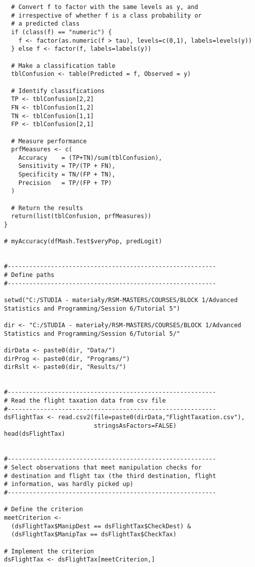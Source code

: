 \documentclass{article}
\begin{document}
\begin{tiny}
\begin{verbatim}
  # Convert f to factor with the same levels as y, and 
  # irrespective of whether f is a class probability or
  # a predicted class
  if (class(f) == "numeric") {
    f <- factor(as.numeric(f > tau), levels=c(0,1), labels=levels(y))
  } else f <- factor(f, labels=labels(y))
  
  # Make a classification table
  tblConfusion <- table(Predicted = f, Observed = y)
  
  # Identify classifications
  TP <- tblConfusion[2,2]
  FN <- tblConfusion[1,2]
  TN <- tblConfusion[1,1]
  FP <- tblConfusion[2,1]
  
  # Measure performance   
  prfMeasures <- c(
    Accuracy    = (TP+TN)/sum(tblConfusion),
    Sensitivity = TP/(TP + FN),
    Specificity = TN/(FP + TN),
    Precision   = TP/(FP + TP)
  )
  
  # Return the results
  return(list(tblConfusion, prfMeasures))
}

# myAccuracy(dfMash.Test$veryPop, predLogit)


#----------------------------------------------------------
# Define paths
#----------------------------------------------------------

setwd("C:/STUDIA - materiały/RSM-MASTERS/COURSES/BLOCK 1/Advanced Statistics and Programming/Session 6/Tutorial 5")

dir <- "C:/STUDIA - materiały/RSM-MASTERS/COURSES/BLOCK 1/Advanced Statistics and Programming/Session 6/Tutorial 5/"

dirData <- paste0(dir, "Data/")
dirProg <- paste0(dir, "Programs/")
dirRslt <- paste0(dir, "Results/")


#----------------------------------------------------------
# Read the flight taxation data from csv file
#----------------------------------------------------------
dsFlightTax <- read.csv2(file=paste0(dirData,"FlightTaxation.csv"),
                         stringsAsFactors=FALSE)
head(dsFlightTax)


#----------------------------------------------------------
# Select observations that meet manipulation checks for 
# destination and flight tax (the third destination, flight 
# information, was hardly picked up)
#----------------------------------------------------------

# Define the criterion
meetCriterion <- 
  (dsFlightTax$ManipDest == dsFlightTax$CheckDest) &
  (dsFlightTax$ManipTax == dsFlightTax$CheckTax)  
  
# Implement the criterion
dsFlightTax <- dsFlightTax[meetCriterion,]



\end{verbatim}
\end{tiny}
\end{document}
